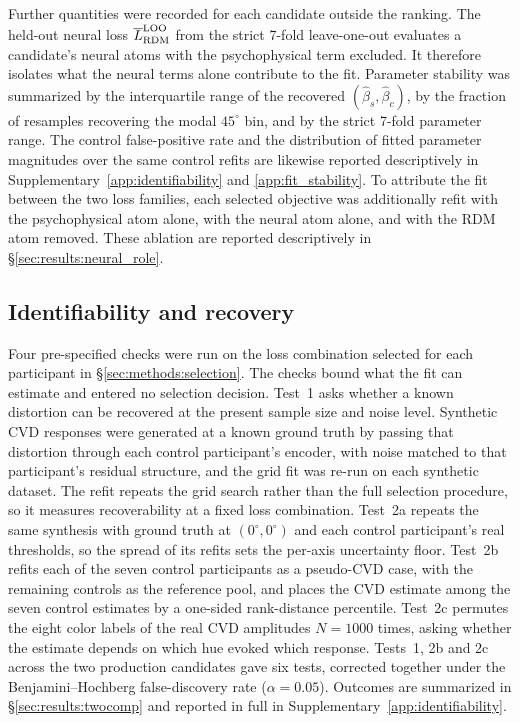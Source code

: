 Further quantities were recorded for each candidate outside the ranking. The held-out neural loss $\overline{L}_{\rm RDM}^{\rm LOO}$ from the strict 7-fold leave-one-out evaluates a candidate's neural atoms with the psychophysical term excluded. It therefore isolates what the neural terms alone contribute to the fit. Parameter stability was summarized by the interquartile range of the recovered $(\hat\beta_s, \hat\beta_c)$, by the fraction of resamples recovering the modal $45^\circ$ bin, and by the strict 7-fold parameter range. The control false-positive rate and the distribution of fitted parameter magnitudes over the same control refits are likewise reported descriptively in Supplementary~\cref{app:identifiability} and \cref{app:fit_stability}. To attribute the fit between the two loss families, each selected objective was additionally refit with the psychophysical atom alone, with the neural atom alone, and with the RDM atom removed. These ablation are reported descriptively in \S\ref{sec:results:neural_role}.

\subsection{Identifiability and recovery}
\label{sec:methods:identifiability}

Four pre-specified checks were run on the loss combination selected for each participant in \S\ref{sec:methods:selection}. The checks bound what the fit can estimate and entered no selection decision. Test~1 asks whether a known distortion can be recovered at the present sample size and noise level. Synthetic CVD responses were generated at a known ground truth by passing that distortion through each control participant's encoder, with noise matched to that participant's residual structure, and the grid fit was re-run on each synthetic dataset. The refit repeats the grid search rather than the full selection procedure, so it measures recoverability at a fixed loss combination. Test~2a repeats the same synthesis with ground truth at $(0^\circ, 0^\circ)$ and each control participant's real thresholds, so the spread of its refits sets the per-axis uncertainty floor. Test~2b refits each of the seven control participants as a pseudo-CVD case, with the remaining controls as the reference pool, and places the CVD estimate among the seven control estimates by a one-sided rank-distance percentile. Test~2c permutes the eight color labels of the real CVD amplitudes $N = 1000$ times, asking whether the estimate depends on which hue evoked which response. Tests~1, 2b and 2c across the two production candidates gave six tests, corrected together under the Benjamini--Hochberg false-discovery rate ($\alpha = 0.05$). Outcomes are summarized in \S\ref{sec:results:twocomp} and reported in full in Supplementary~\cref{app:identifiability}.

